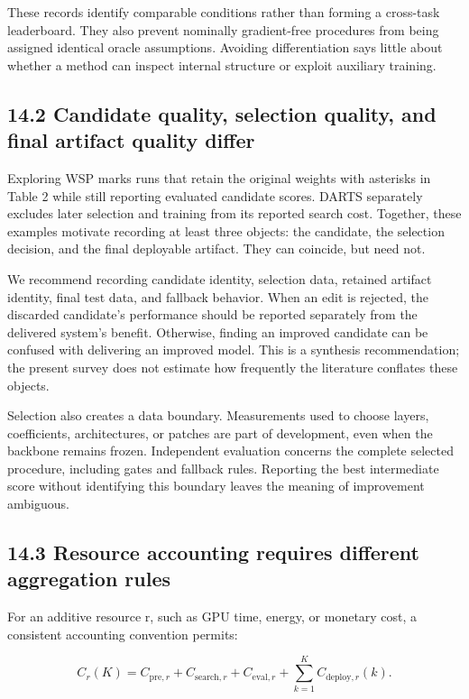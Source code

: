 These records identify comparable conditions rather than forming a cross-task leaderboard. They also prevent nominally gradient-free procedures from being assigned identical oracle assumptions. Avoiding differentiation says little about whether a method can inspect internal structure or exploit auxiliary training.


\subsection*{14.2 Candidate quality, selection quality, and final artifact quality differ}

Exploring WSP marks runs that retain the original weights with asterisks in Table 2 while still reporting evaluated candidate scores.\cite{r1} DARTS separately excludes later selection and training from its reported search cost.\cite{r136} Together, these examples motivate recording at least three objects: the candidate, the selection decision, and the final deployable artifact. They can coincide, but need not.


We recommend recording candidate identity, selection data, retained artifact identity, final test data, and fallback behavior. When an edit is rejected, the discarded candidate's performance should be reported separately from the delivered system's benefit. Otherwise, finding an improved candidate can be confused with delivering an improved model. This is a synthesis recommendation; the present survey does not estimate how frequently the literature conflates these objects.


Selection also creates a data boundary. Measurements used to choose layers, coefficients, architectures, or patches are part of development, even when the backbone remains frozen. Independent evaluation concerns the complete selected procedure, including gates and fallback rules. Reporting the best intermediate score without identifying this boundary leaves the meaning of improvement ambiguous.


\subsection*{14.3 Resource accounting requires different aggregation rules}

For an additive resource r, such as GPU time, energy, or monetary cost, a consistent accounting convention permits:


\[C_r(K)=C_{\mathrm{pre},r}+C_{\mathrm{search},r}+C_{\mathrm{eval},r}+\sum_{k=1}^{K}C_{\mathrm{deploy},r}(k).\]

